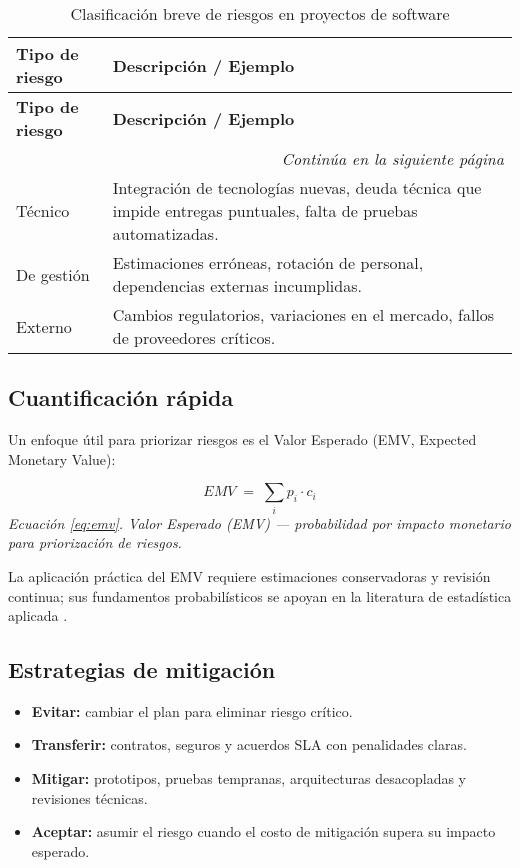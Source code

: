 \begin{longtable}{p{4cm} p{11cm}}
\caption{Clasificación breve de riesgos en proyectos de software} \\
\toprule
\textbf{Tipo de riesgo} & \textbf{Descripción / Ejemplo} \\
\midrule
\endfirsthead

\toprule
\textbf{Tipo de riesgo} & \textbf{Descripción / Ejemplo} \\
\midrule
\endhead

\multicolumn{2}{r}{\textit{Continúa en la siguiente página}} \\
\endfoot

\bottomrule
\endlastfoot

Técnico & Integración de tecnologías nuevas, deuda técnica que impide entregas puntuales, falta de pruebas automatizadas. \\

De gestión & Estimaciones erróneas, rotación de personal, dependencias externas incumplidas. \\

Externo & Cambios regulatorios, variaciones en el mercado, fallos de proveedores críticos. \\
\end{longtable}

\subsection*{Cuantificación rápida}
Un enfoque útil para priorizar riesgos es el Valor Esperado (EMV, Expected Monetary Value):

\begin{equation}\label{eq:emv}
EMV \;=\; \sum_{i} p_i \cdot c_i
\end{equation}
\noindent\textit{Ecuación \ref{eq:emv}. Valor Esperado (EMV) — probabilidad por impacto monetario para priorización de riesgos.}

La aplicación práctica del EMV requiere estimaciones conservadoras y revisión continua; sus fundamentos probabilísticos se apoyan en la literatura de estadística aplicada \parencite{ross2014}.

\subsection*{Estrategias de mitigación}
\begin{itemize}
  \item \textbf{Evitar:} cambiar el plan para eliminar riesgo crítico.
  \item \textbf{Transferir:} contratos, seguros y acuerdos SLA con penalidades claras.
  \item \textbf{Mitigar:} prototipos, pruebas tempranas, arquitecturas desacopladas y revisiones técnicas.
  \item \textbf{Aceptar:} asumir el riesgo cuando el costo de mitigación supera su impacto esperado.
\end{itemize}

